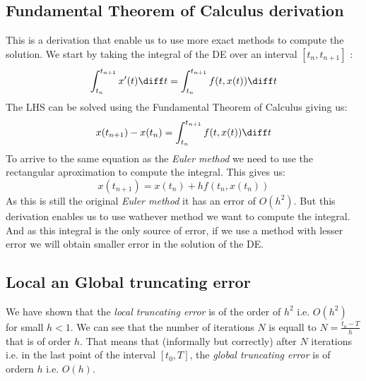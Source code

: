 \documentclass[../ode.tex]{subfiles}
\begin{document}
    \subsection{\sffamily Fundamental Theorem of Calculus derivation}
    
    This is a derivation that enable us to use more exact methods to compute the solution. We start by taking the integral of the
    DE over an interval $[t_{n}, t_{n+1}]$ :
    \begin{equation*}
        \int_{t_{n}}^{t_{n+1}} x'(t) \diff t = \int_{t_{n}}^{t_{n+1}} f(t,x(t)) \diff t
    \end{equation*}
    The LHS can be solved using the Fundamental Theorem of Calculus giving us:
    \begin{equation*}
        x(t_{n+1}) - x(t_{n}) = \int_{t_{n}}^{t_{n+1}} f(t,x(t)) \diff t
    \end{equation*}
    To arrive to the same equation as the \emph{Euler method} we need to use the rectangular aproximation to compute the integral.
    This gives us:
    \begin{equation*}
        x(t_{n+1}) = x(t_{n}) + h f(t_{n},x(t_{n}))
    \end{equation*}
    As this is still the original \emph{Euler method} it has an error of $O(h^2)$. But this derivation enables us to use wathever
    method we want to compute the integral. And as this integral is the only source of error, if we use a method with lesser error
    we will obtain smaller error in the solution of the DE.
    
    \subsection{\sffamily Local an Global truncating error}
    
    We have shown that the \emph{local truncating error} is of the order of $h^2$ i.e. $O(h^2)$ for small $h<1$. We can see that
    the number of iterations $N$ is equall to $N=\frac{t_o - T}{h}$ that is of order $h$. That means that (informally but
    correctly) after $N$ iterations i.e. in the last point of the interval $[t_0, T]$, the \emph{global truncating error} is of
    ordern $h$ i.e. $O(h)$.
    
\end{document}
